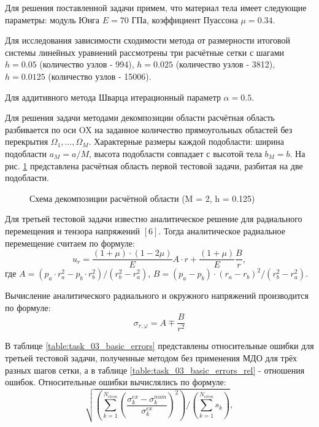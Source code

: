 \documentclass[a4paper, 14pt]{extarticle}
\newcommand{\area}{rectangle}
\newcommand{\task}{3_fixes}
\newcommand{\taskNum}{01}
\begin{document}
Для решения поставленной задачи примем, что материал тела имеет следующие параметры: модуль Юнга $E = 70$ ГПа, коэффициент Пуассона $\mu = 0.34$. 

Для исследования зависимости сходимости метода от размерности итоговой системы линейных уравнений рассмотрены три расчётные сетки с шагами $h = 0.05$ (количество узлов - 994), $h = 0.025$ (количество узлов - 3812), $h = 0.0125$ (количество узлов - 15006).

Для аддитивного метода Шварца итерационный параметр $\alpha = 0.5$.

\newpage

Для решения задачи методами декомпозиции области расчётная область разбивается по оси OX на заданное количество прямоугольных областей без перекрытия $\Omega_1, \ldots, \Omega_M$. Характерные размеры каждой подобласти: ширина подобласти $a_M = a / M$, высота подобласти совпадает с высотой тела $b_M = b$. На рис. \ref{fig:task_\taskNum_decomposition} представлена расчётная область первой тестовой задачи, разбитая на две подобласти.

\begin{figure}[h]
\caption{Схема декомпозиции расчётной области (M = 2, h = 0.125)}
\label{fig:task_\taskNum_decomposition}
\end{figure}

\newpage

Для третьей тестовой задачи известно аналитическое решение для радиального перемещения и тензора напряжений $\left[6\right]$. Тогда аналитическое радиальное перемещение считаем по формуле:
\begin{equation*}
u_r = \frac{(1 + \mu) \cdot (1 - 2\mu)}{E}A \cdot r + \frac{(1 + \mu)}{E} \frac{B}{r},
\end{equation*}
где $A = (p_a \cdot r_a^2 - p_b \cdot r_b^2) / (r_b^2 - r_a^2)$, $B = (p_a - p_b) \cdot (r_a - r_b)^2 / (r_b^2 - r_a^2)$.

Вычисление аналитического радиального и окружного напряжений производится по формуле:
\begin{equation*}
\sigma_{r, \varphi} = A \mp \frac{B}{r^2}
\end{equation*}

В таблице \ref{table:task_03_basic_errors} представлены относительные ошибки для третьей тестовой задачи, полученные методом без применения МДО для трёх разных шагов сетки, а в таблице \ref{table:task_03_basic_errors_rel} - отношения ошибок. Относительные ошибки вычислялись по формуле:
\begin{equation*}
\sqrt{\left(\sum_{k = 1}^{N_{elem}} {\left(\frac{\sigma_k^{ex} - \sigma_k^{num}}{\sigma_k^{ex}}\right)^2}\right) / \left(\sum_{k=1}^{N_{elem}} {s_k}\right)},
\end{equation*}
\end{document}
